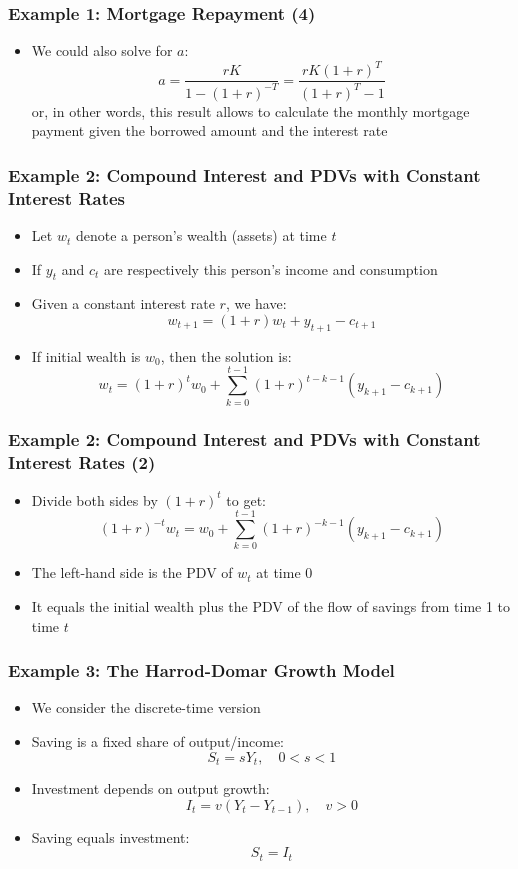 \documentclass[10pt,usenames,dvipsnames]{beamer}
\theoremstyle{plain}
\theoremstyle{definition}
\begin{document}
\begin{frame}[fragile]
\frametitle{Example 1: Mortgage Repayment (4)}
\begin{itemize}
	\item We could also solve for $a$:
	\[
		a = \frac{rK}{1 - (1+r)^{-T}} = \frac{rK(1+r)^{T}}{(1+r)^{T} - 1}
	\]
	or, in other words, this result allows to calculate the monthly mortgage payment given the borrowed amount and the interest rate
\end{itemize}
\end{frame}

\begin{frame}[fragile]
\frametitle{Example 2: Compound Interest and PDVs with Constant Interest Rates}
\begin{itemize}
	\item Let $w_{t}$ denote a person's wealth (assets) at time $t$
	\item If $y_{t}$ and $c_{t}$ are respectively this person's income and consumption
	\item Given a constant interest rate $r$, we have:
	\[
		w_{t+1} = (1+r)w_{t} + y_{t+1} - c_{t+1}
	\]
	\item If initial wealth is $w_{0}$, then the solution is:
	\[
		w_{t} = (1+r)^{t}w_{0} + \sum_{k=0}^{t-1}(1+r)^{t-k-1}(y_{k+1} - c_{k+1})
	\]
\end{itemize}
\end{frame}


\begin{frame}[fragile]
\frametitle{Example 2: Compound Interest and PDVs with Constant Interest Rates (2)}
\begin{itemize}
	\item Divide both sides by $(1 + r)^{t}$ to get:
	\[
		(1+r)^{-t}w_{t} = w_{0} + \sum_{k=0}^{t-1}(1+r)^{-k-1}(y_{k+1} - c_{k+1})
	\]
	\item The left-hand side is the PDV of $w_{t}$ at time 0
	\item It equals the initial wealth plus the PDV of the flow of savings from time 1 to time $t$
\end{itemize}
\end{frame}

\begin{frame}[fragile]
\frametitle{Example 3: The Harrod-Domar Growth Model}
\begin{itemize}
	\item We consider the discrete-time version
	\item Saving is a fixed share of output/income:
	\[
		S_{t} = s Y_{t},\quad 0 < s < 1
	\]
	\item Investment depends on output growth:
	\[
		I_{t} = v(Y_{t} - Y_{t-1}), \quad v > 0
	\]
	\item Saving equals investment:
	\[
		S_{t} = I_{t}
	\]
\end{itemize}
\end{frame}
\end{document}
